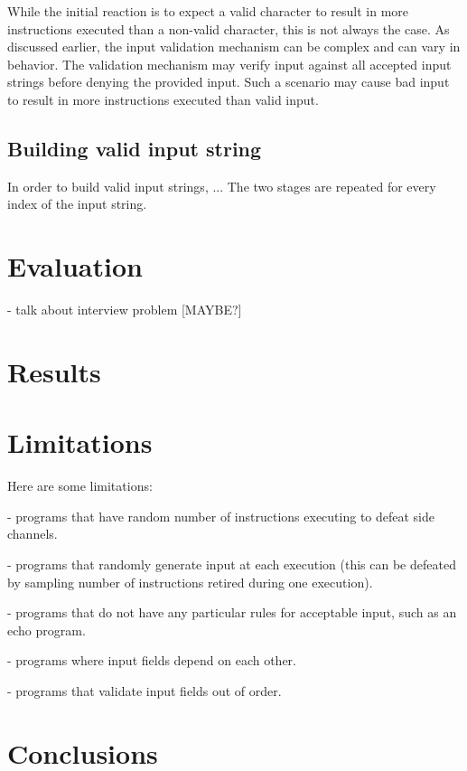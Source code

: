 \documentclass[11pt,twocolumn]{article}
\begin{document}
While the initial reaction is to expect a valid character to result in more instructions executed than a non-valid character, this is not always the case.
As discussed earlier, the input validation mechanism can be complex and can vary in behavior.
The validation mechanism may verify input against all accepted input strings before denying the provided input.
Such a scenario may cause bad input to result in more instructions executed than valid input.

\subsection{Building valid input string}

In order to build valid input strings, ...
The two stages are repeated for every index of the input string.

\section{Evaluation}

- talk about interview problem [MAYBE?]

\section{Results}

\section{Limitations}

Here are some limitations:

- programs that have random number of instructions executing to defeat side channels.

- programs that randomly generate input at each execution (this can be defeated by sampling number of instructions retired during one execution).

- programs that do not have any particular rules for acceptable input, such as an echo program.

- programs where input fields depend on each other.

- programs that validate input fields out of order.

\section{Conclusions}
\end{document}
